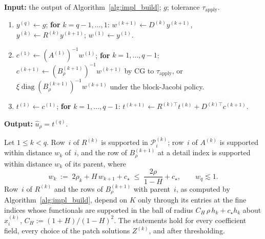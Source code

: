 \documentclass[hidelinks]{siamart}
\theoremstyle{nonumberplain}
\numberwithin{theorem}{section}
\begin{document}
\begin{algorithm}[t]
\caption{Apply}
\label{alg:impl_apply}
\textbf{Input:} the output of Algorithm~\ref{alg:impl_build}; $g$;
tolerance $\tau_{\mathrm{apply}}$.
\begin{enumerate}
  \item[1.] $y^{(q)} \gets g$; \textbf{for} $k = q-1, \ldots, 1$:
    $w^{(k+1)} \gets D^{(k)} y^{(k+1)}$, $y^{(k)} \gets R^{(k)} y^{(k+1)}$;
    $w^{(1)} \gets y^{(1)}$.
  \item[2.] $c^{(1)} \gets (A^{(1)})^{-1} w^{(1)}$; \textbf{for}
    $k = 1, \ldots, q-1$: $c^{(k+1)} \gets (B^{(k+1)}_\rho)^{-1} w^{(k+1)}$
    by CG to $\tau_{\mathrm{apply}}$, or
    $\xi \operatorname{diag}(B^{(k+1)}_\rho)^{-1} w^{(k+1)}$ under the
    block-Jacobi policy.
  \item[3.] $t^{(1)} \gets c^{(1)}$; \textbf{for} $k = 1, \ldots, q-1$:
    $t^{(k+1)} \gets R^{(k)\top} t^{(k)} + D^{(k)\top} c^{(k+1)}$.
\end{enumerate}
\textbf{Output:} $\hat{u}_\rho = t^{(q)}$.
\end{algorithm}

\begin{proposition}\label{prop:stencil_width}
Let $1 \leq k < q$.  Row~$i$ of $R^{(k)}$ is supported in
$\mathcal{P}^{(k)}_i$; row~$i$ of $A^{(k)}$ is supported within distance
$w_k$ of~$i$, and the row of $B^{(k+1)}_\rho$ at a detail index is
supported within distance $w_k$ of its parent, where
\begin{equation}\label{eq:width_recursion}
  w_k \;:=\; 2 \rho_k + H\, w_{k+1} + c_\star
  \;\leq\; \frac{2\rho}{1-H} + c_\star ,
  \qquad w_q \lesssim 1 .
\end{equation}
Row~$i$ of $R^{(k)}$ and the rows of $B^{(k+1)}_\rho$ with parent~$i$, as
computed by Algorithm~\ref{alg:impl_build}, depend on $K$ only through
its entries at the fine indices whose functionals are supported in the
ball of radius $C_H\, \rho\, h_k + c_\star h_k$ about $x^{(k)}_i$,
$C_H := (1+H)/(1-H)^2$.  The statements hold for every coefficient field, every choice of the
patch solutions $Z^{(k)}$, and after thresholding.
\end{proposition}
\end{document}
